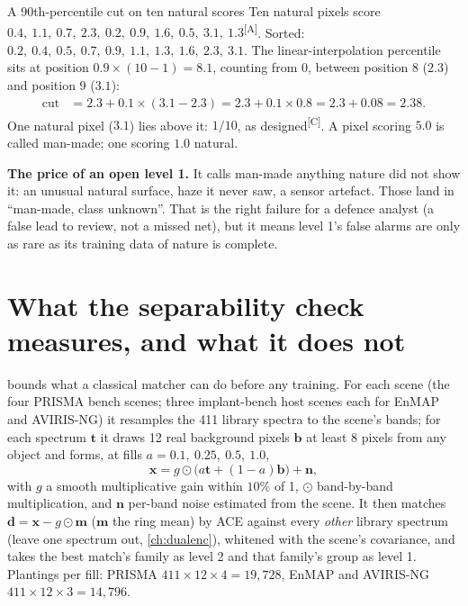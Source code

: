 \documentclass[11pt,a4paper,oneside,openany]{book}
\newcommand{\B}[1]{{\symbf{#1}}}
\newcommand{\B}[1]{{\bm{#1}}}
\newcommand{\comp}{\textsuperscript{\textsf{\scriptsize[C]}}}
\newcommand{\assm}{\textsuperscript{\textsf{\scriptsize[A]}}}
\newcommand{\vx}{\B{x}}
\newcommand{\vt}{\B{t}}
\newcommand{\vb}{\B{b}}
\newcommand{\vn}{\B{n}}
\newcommand{\vd}{\B{d}}
\newcommand{\vm}{\B{m}}
\begin{document}
\begin{worked}[label=we:openthresh]{A 90th-percentile cut on ten natural scores}
Ten natural pixels score $0.4,\ 1.1,\ 0.7,\ 2.3,\ 0.2,\ 0.9,\ 1.6,\ 0.5,\ 3.1,\ 1.3$\assm. Sorted: $0.2,\ 0.4,\ 0.5,\ 0.7,\ 0.9,\ 1.1,\ 1.3,\ 1.6,\ 2.3,\ 3.1$. The
linear-interpolation percentile sits at position $0.9\times(10-1)=8.1$, counting from 0, between position 8 ($2.3$) and position 9 ($3.1$):
\begin{align*}
\text{cut} &= 2.3+0.1\times(3.1-2.3)=2.3+0.1\times0.8=2.3+0.08=2.38 .
\end{align*}
One natural pixel ($3.1$) lies above it: $1/10$, as designed\comp. A pixel scoring $5.0$ is called man-made; one scoring $1.0$ natural.
\end{worked}

\textbf{The price of an open level 1.} It calls man-made anything nature did not show it: an unusual natural surface, haze it never saw, a sensor artefact. Those land in
``man-made, class unknown''. That is the right failure for a defence analyst (a false lead to review, not a missed net), but it means level 1's false alarms are only as
rare as its training data of nature is complete.

\section{What the separability check measures, and what it does not}

 bounds what a classical matcher can do before any training. For each scene (the four PRISMA bench scenes; three implant-bench host
scenes each for EnMAP and AVIRIS-NG) it resamples the 411 library spectra to the scene's bands; for each spectrum $\vt$ it draws 12 real background pixels $\vb$ at
least 8 pixels from any object and forms, at fills $a=0.1,\ 0.25,\ 0.5,\ 1.0$,
\[
  \vx=g\odot\big(a\vt+(1-a)\vb\big)+\vn,
\]
with $g$ a smooth multiplicative gain within $10\%$ of 1, $\odot$ band-by-band multiplication, and $\vn$ per-band noise estimated from the scene. It then matches
$\vd=\vx-g\odot\vm$ ($\vm$ the ring mean) by ACE against every \emph{other} library spectrum (leave one spectrum out, \cref{ch:dualenc}), whitened with the scene's
covariance, and takes the best match's family as level 2 and that family's group as level 1. Plantings per fill: PRISMA $411\times12\times4=19{,}728$, EnMAP and AVIRIS-NG
$411\times12\times3=14{,}796$.
\end{document}
